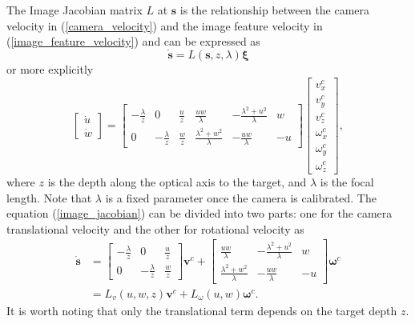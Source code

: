 The Image Jacobian matrix $L$ at $\mathbf{s}$ is the relationship between the camera velocity in (\ref{camera_velocity}) and the image feature velocity in (\ref{image_feature_velocity}) and can be expressed as 
\begin{equation}
\mathbf{\dot{s}}=L(\mathbf{s},z,\lambda)\mathbf{\xi}
\end{equation}
or more explicitly
\begin{equation}
\begin{bmatrix}
\dot{u} \\ \dot{w}
\end{bmatrix}
=\begin{bmatrix}
-\frac{\lambda}{z} & 0 & \frac{u}{z} & \frac{uw}{\lambda} & -\frac{\lambda^2+u^2}{\lambda} & w \\
0 & -\frac{\lambda}{z} & \frac{w}{z} & \frac{\lambda^2+w^2}{\lambda} & -\frac{uw}{\lambda} & -u
\end{bmatrix}
\begin{bmatrix}
v_x^c \\ v_y^c \\ v_z^c \\
\omega_x^c \\ \omega_y^c \\ \omega_z^c
\end{bmatrix},
\label{image_jacobian}
\end{equation}
where $z$ is the depth along the optical axis to the target, and $\lambda$ is the focal length. Note that $\lambda$ is a fixed parameter once the camera is calibrated. The equation (\ref{image_jacobian}) can be divided into two parts: one for the camera translational velocity and the other for rotational velocity as
\begin{align}
\mathbf{\dot{s}}&=\begin{bmatrix}
-\frac{\lambda}{z} & 0 & \frac{u}{z} \\
0 & -\frac{\lambda}{z} & \frac{w}{z}
\end{bmatrix}\mathbf{v}^c+
\begin{bmatrix}
\frac{uw}{\lambda} & -\frac{\lambda^2+u^2}{\lambda} & w \\
\frac{\lambda^2+w^2}{\lambda} & -\frac{uw}{\lambda} & -u
\end{bmatrix}\mathbf{\omega}^c
\\&=L_v(u,w,z)\mathbf{v}^c+L_{\omega}(u,w)\mathbf{\omega}^c.
\label{image_jacobian1}
\end{align}
It is worth noting that only the translational term depends on the target depth $z$. 

